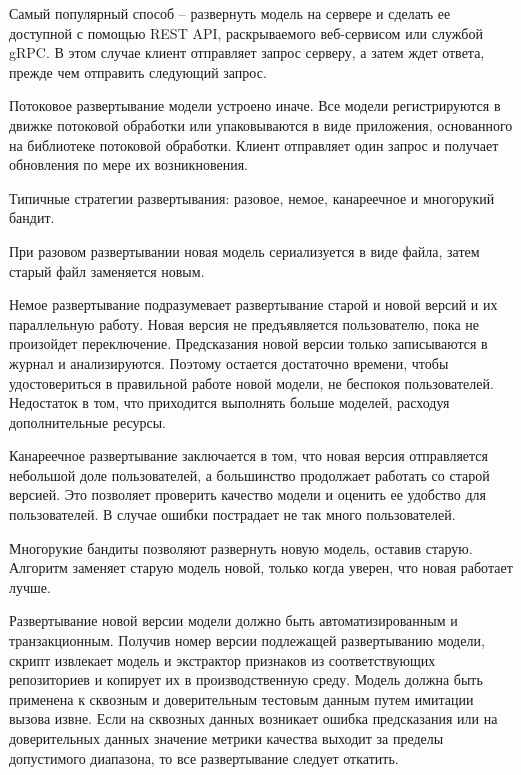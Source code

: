 {	\par \redline Самый популярный способ – развернуть модель на сервере и сделать ее
	доступной с помощью REST API, раскрываемого веб-сервисом или службой
	gRPC. В этом случае клиент отправляет запрос серверу, а затем ждет ответа,
	прежде чем отправить следующий запрос.
	
	\par \redline Потоковое развертывание модели устроено иначе. Все модели регистрируются в движке потоковой обработки или упаковываются в виде приложения,
	основанного на библиотеке потоковой обработки. Клиент отправляет один
	запрос и получает обновления по мере их возникновения.
	
	\par \redline Типичные стратегии развертывания: разовое, немое, канареечное и многорукий бандит.
	
	\par \redline  При разовом развертывании новая модель сериализуется в виде файла,
	затем старый файл заменяется новым.
	
	\par \redline  Немое развертывание подразумевает развертывание старой и новой версий и их параллельную работу. Новая версия не предъявляется пользователю,
	пока не произойдет переключение. Предсказания новой версии только записываются в журнал и анализируются. Поэтому остается достаточно времени,
	чтобы удостовериться в правильной работе новой модели, не беспокоя пользователей. Недостаток в том, что приходится выполнять больше моделей,
	расходуя дополнительные ресурсы.
	
	\par \redline  Канареечное развертывание заключается в том, что новая версия отправляется небольшой доле пользователей, а большинство продолжает работать со старой версией. Это позволяет проверить качество модели и оценить ее
	удобство для пользователей. В случае ошибки пострадает не так много пользователей.
	
	\par \redline  Многорукие бандиты позволяют развернуть новую модель, оставив старую. Алгоритм заменяет старую модель новой, только когда уверен, что новая
	работает лучше.
	
	\par \redline Развертывание новой версии модели должно быть автоматизированным
	и транзакционным. Получив номер версии подлежащей развертыванию модели, скрипт извлекает модель и экстрактор признаков из соответствующих
	репозиториев и копирует их в производственную среду. Модель должна быть
	применена к сквозным и доверительным тестовым данным путем имитации
	вызова извне. Если на сквозных данных возникает ошибка предсказания или
	на доверительных данных значение метрики качества выходит за пределы
	допустимого диапазона, то все развертывание следует откатить.
	
}
